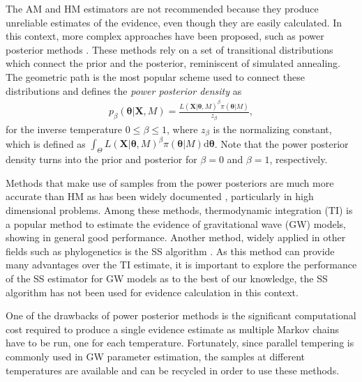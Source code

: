 \documentclass[aps,reprint,amsmath,amssymb,showpacs,showkeys]{revtex4-1}%
\begin{document}
The AM and HM estimators are not recommended because they produce unreliable estimates of the evidence, even though they are easily calculated.   In this context, more complex approaches have been proposed, such as power posterior methods \cite{Xie:Lewis:Fan:Kuo:Chen:2011, Lartillot:Philippe:2006, Friel:2008, Neal:2001}.  These methods rely on a set of transitional distributions which connect the prior and the posterior, reminiscent of simulated annealing.  The geometric path is the most popular scheme used to connect these distributions and defines the \textit{power posterior density} as
\begin{align}\label{eq:powerposterior}
p_{\beta}(\bm{\theta}|\bm{X}, M) = \frac{L(\bm{X}|\bm{\theta},M)^{\beta}\pi(\bm{\theta}|M)}{z_{\beta}},
\end{align}
for the inverse temperature $0\leq\beta\leq 1$, where $z_{\beta}$ is the normalizing constant, which is defined as $\int_{\Theta} L(\bm{X}|\bm{\theta},M)^{\beta}\pi(\bm{\theta}|M) \text{d}\bm{\theta}$. Note that the power posterior density turns into the prior and posterior for $\beta = 0$ and $\beta = 1$, respectively.   

Methods  that make use of samples from the power posteriors are much more accurate than HM as has been widely documented \citep{Lartillot:Philippe:2006, Newton:Raftery:1994, Xie:Lewis:Fan:Kuo:Chen:2011}, particularly in high dimensional problems.  Among these methods, thermodynamic integration (TI) \citep{Lartillot:Philippe:2006} is a popular method to estimate the  evidence  of gravitational wave (GW) models, showing in general good performance.  Another method, widely applied in other fields such as phylogenetics is the SS algorithm \citep{Xie:Lewis:Fan:Kuo:Chen:2011}.  As this method
can provide many advantages over the TI estimate, it is important to explore the performance of  the SS estimator  for GW models as  to the best of our knowledge,  the SS algorithm has not been used for evidence calculation in this context.

One of the drawbacks of power posterior methods is the significant computational cost required to produce a single evidence estimate as 
multiple Markov chains have to be run, one for each temperature.  Fortunately, since  parallel tempering is commonly used in GW parameter estimation, the samples at different temperatures are available and can be recycled in order to use these methods.
\end{document}
